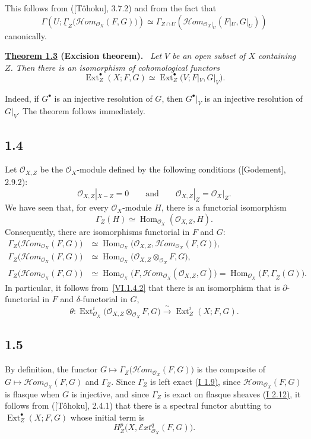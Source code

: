 \documentclass[11pt,a4paper,oneside]{book}
\providecommand{\SheafGamma}{\underline{\Gamma}}
\providecommand{\SheafHom}{\mathcal H\!om}
\providecommand{\SheafExt}{\mathcal E\!xt}
\providecommand{\OX}{\mathcal O_X}
\providecommand{\OoXZ}{\mathcal O_{X,Z}}
\providecommand{\Homop}{\operatorname{Hom}}
\providecommand{\Ext}{\operatorname{Ext}}
\newenvironment{sgastatement}[1]
  {\par\addvspace{0.8\baselineskip}\noindent\textbf{#1.}\ \itshape}
  {\par\addvspace{0.35\baselineskip}}
\theoremstyle{plain}
\theoremstyle{definition}
\theoremstyle{remark}
\begin{document}
This follows from \textup{([T\^ohoku], 3.7.2)} and from the fact that
\[
 \Gamma\!\left(U;\SheafGamma_Z\bigl(\SheafHom_{\OX}(F,G)\bigr)\right)
 \simeq
 \Gamma_{Z\cap U}\!\left(\SheafHom_{\OX|_U}(F|_U,G|_U)\right)
\]
canonically.

\begin{sgastatement}{\hyperref[VI.1.3]{Theorem 1.3} (Excision theorem)}
Let $V$ be an open subset of $X$ containing $Z$. Then there is an
isomorphism of cohomological functors
\begin{equation}
 \Ext_Z^{\bullet}(X;F,G)
 \simeq
 \Ext_Z^{\bullet}\bigl(V;F|_V,G|_V\bigr).
 \tag{1.3.1}\label{VI.1.3.1}
\end{equation}
\end{sgastatement}

Indeed, if $G^{\bullet}$ is an injective resolution of $G$, then
$G^{\bullet}|_V$ is an injective resolution of $G|_V$. The theorem follows
immediately.

\subsection*{1.4}
Let $\OoXZ$ be the $\OX$-module defined by the following conditions
\textup{([Godement], 2.9.2)}:
\[
 \OoXZ|_{X-Z}=0
 \qquad\text{and}\qquad
 \OoXZ|_Z=\OX|_Z.
\]
We have seen that, for every $\OX$-module $H$, there is a functorial
isomorphism
\[
 \Gamma_Z(H)\simeq \Homop_{\OX}(\OoXZ,H).
\]
Consequently, there are isomorphisms functorial in $F$ and $G$:
\begin{align}
 \Gamma_Z\bigl(\SheafHom_{\OX}(F,G)\bigr)
  &\simeq \Homop_{\OX}\bigl(\OoXZ,\SheafHom_{\OX}(F,G)\bigr),
   \tag{1.4.1}\label{VI.1.4.1}\\[-0.15em]
 \Gamma_Z\bigl(\SheafHom_{\OX}(F,G)\bigr)
  &\simeq \Homop_{\OX}\bigl(\OoXZ\otimes_{\OX}F,G\bigr),
   \tag{1.4.2}\label{VI.1.4.2}\\[-0.15em]
 \Gamma_Z\bigl(\SheafHom_{\OX}(F,G)\bigr)
  &\simeq \Homop_{\OX}\bigl(F,\SheafHom_{\OX}(\OoXZ,G)\bigr)
   =\Homop_{\OX}\bigl(F,\SheafGamma_Z(G)\bigr).
   \tag{1.4.3}\label{VI.1.4.3}
\end{align}
In particular, it follows from~\eqref{VI.1.4.2} that there is an
isomorphism that is $\partial$-functorial in $F$ and $\delta$-functorial in $G$,
\[
 \theta\colon
 \Ext_{\OX}^{i}\bigl(\OoXZ\otimes_{\OX}F,G\bigr)
 \xrightarrow{\ \sim\ }
 \Ext_Z^{i}(X;F,G).
\]

\subsection*{1.5}
By definition, the functor
$G\longmapsto\Gamma_Z\bigl(\SheafHom_{\OX}(F,G)\bigr)$ is the composite of
$G\longmapsto\SheafHom_{\OX}(F,G)$ and $\Gamma_Z$. Since $\Gamma_Z$ is left
exact \textup{(\hyperref[I.1.9]{I 1.9)}}, since $\SheafHom_{\OX}(F,G)$ is flasque when $G$ is
injective, and since $\Gamma_Z$ is exact on flasque sheaves \textup{(\hyperref[I.2.12]{I 2.12)}},
it follows from \textup{([T\^ohoku], 2.4.1)} that there is a spectral functor
abutting to $\Ext_Z^{\bullet}(X;F,G)$ whose initial term is
\[
 H_Z^p\bigl(X,\SheafExt_{\OX}^q(F,G)\bigr).
\]
\end{document}
